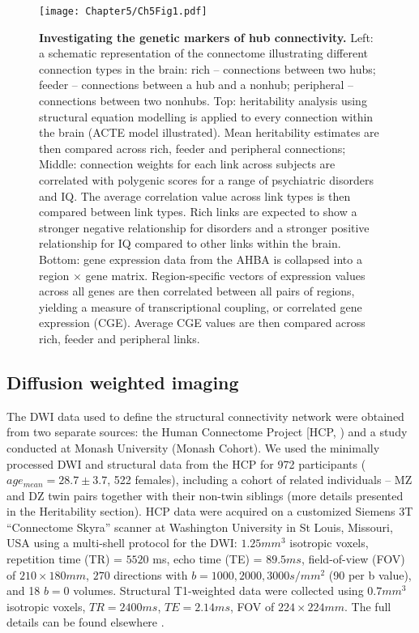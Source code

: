 \begin{figure}[h!]
\begin{center}
\texttt{[image: Chapter5/Ch5Fig1.pdf]}%
\end{center}
\caption{\textbf{Investigating the genetic markers of hub connectivity.}
Left: a schematic representation of the connectome illustrating different connection types in the brain: rich – connections between two hubs; feeder – connections between a hub and a nonhub; peripheral – connections between two nonhubs. Top: heritability analysis using structural equation modelling is applied to every connection within the brain (ACTE model illustrated). Mean heritability estimates are then compared across rich, feeder and peripheral connections; Middle: connection weights for each link across subjects are correlated with polygenic scores for a range of psychiatric disorders and IQ. The average correlation value across link types is then compared between link types. Rich links are expected to show a stronger negative relationship for disorders and a stronger positive relationship for IQ compared to other links within the brain. Bottom: gene expression data from the AHBA is collapsed into a region $\times$ gene matrix. Region-specific vectors of expression values across all genes are then correlated between all pairs of regions, yielding a measure of transcriptional coupling, or correlated gene expression (CGE). Average CGE values are then compared across rich, feeder and peripheral links.}
\label{fig:Ch5Fig1}
\end{figure}

\subsection*{Diffusion weighted imaging}
\label{sec:DWI}

The DWI data used to define the structural connectivity network were obtained from two separate sources: the Human Connectome Project [HCP, \citep{VanEssen2013}) and a study conducted at Monash University (Monash Cohort). We used the minimally processed DWI and structural data from the HCP for 972 participants ($age_{mean} = 28.7 \pm 3.7$, 522 females), including a cohort of related individuals – MZ and DZ twin pairs together with their non-twin siblings (more details presented in the Heritability section). HCP data were acquired on a customized Siemens 3T ``Connectome Skyra'' scanner at Washington University in St Louis, Missouri, USA using a multi‐shell protocol for the DWI: $1.25 mm^{3}$ isotropic voxels, repetition time (TR) = $5520$ ms, echo time (TE) = $89.5 ms$,  field-of-view (FOV) of $210 \times 180 mm$, $270$ directions with $b = 1000, 2000, 3000 s/mm^{2}$ (90 per b value), and 18 $b = 0$ volumes. Structural T1-weighted data were collected using $0.7 mm^{3}$ isotropic voxels, $TR = 2400 ms$, $TE = 2.14 ms$, FOV of $224 \times 224 mm$. The full details can be found elsewhere \citep{Glasser2013}.

